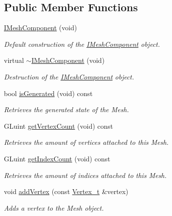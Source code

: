 \subsection*{Public Member Functions}
\begin{DoxyCompactItemize}
\item 
\hyperlink{classsparky_1_1_i_mesh_component_a6f8e0ecbc4aead0d64bd38de85490ba2}{I\+Mesh\+Component} (void)
\begin{DoxyCompactList}\small\item\em Default construction of the \hyperlink{classsparky_1_1_i_mesh_component}{I\+Mesh\+Component} object. \end{DoxyCompactList}\item 
virtual \hyperlink{classsparky_1_1_i_mesh_component_a29e7e8958dcb700c6091b96776c173e0}{$\sim$\+I\+Mesh\+Component} (void)
\begin{DoxyCompactList}\small\item\em Destruction of the \hyperlink{classsparky_1_1_i_mesh_component}{I\+Mesh\+Component} object. \end{DoxyCompactList}\item 
bool \hyperlink{classsparky_1_1_i_mesh_component_a84075b30418ccf0db945ae6e3d13f7f9}{is\+Generated} (void) const 
\begin{DoxyCompactList}\small\item\em Retrieves the generated state of the Mesh. \end{DoxyCompactList}\item 
G\+Luint \hyperlink{classsparky_1_1_i_mesh_component_af3ef1c56955fd299211632c56bf56fb5}{get\+Vertex\+Count} (void) const 
\begin{DoxyCompactList}\small\item\em Retrieves the amount of vertices attached to this Mesh. \end{DoxyCompactList}\item 
G\+Luint \hyperlink{classsparky_1_1_i_mesh_component_a493b111e383f4c87068206b275e90442}{get\+Index\+Count} (void) const 
\begin{DoxyCompactList}\small\item\em Retrieves the amount of indices attached to this Mesh. \end{DoxyCompactList}\item 
void \hyperlink{classsparky_1_1_i_mesh_component_a16f381696867b3b32d8c929e8083d5a3}{add\+Vertex} (const \hyperlink{structsparky_1_1_vertex__t}{Vertex\+\_\+t} \&vertex)
\begin{DoxyCompactList}\small\item\em Adds a vertex to the Mesh object. \end{DoxyCompactList}\item 

\end{DoxyCompactItemize}
